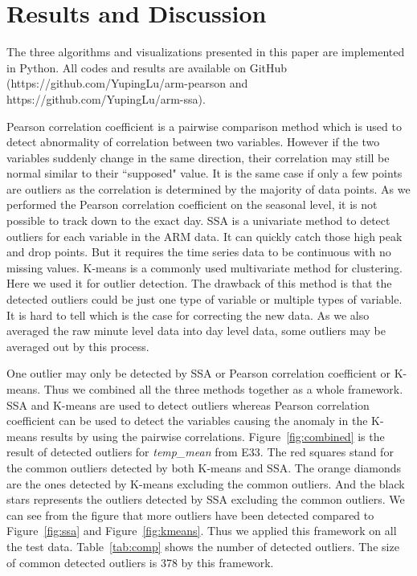 \section{Results and Discussion}
The three algorithms and visualizations presented in this paper are 
implemented in Python. All codes and results are available on GitHub 
(https://github.com/YupingLu/arm-pearson and https://github.com/YupingLu/arm-ssa). 

Pearson correlation coefficient is a pairwise comparison method which 
is used to detect abnormality of correlation between two variables. 
However if the two variables suddenly change in the same direction, 
their correlation may still be normal similar to their ``supposed" 
value. It is the same case if only a few points are outliers as the
correlation is determined by the majority of data points. 
As we performed the Pearson correlation 
coefficient on the seasonal level, it is not possible to track down 
to the exact day. SSA is a univariate method to detect outliers for 
each variable in the ARM data. It can quickly catch those high peak 
and drop points. But it requires the time series data to be continuous 
with no missing values. K-means is a commonly used multivariate method 
for clustering. Here we used it for outlier detection. The drawback of this method is 
that the detected outliers could be just one type of variable or 
multiple types of variable. It is hard to tell which is the case for 
correcting the new data. As we also averaged the raw 
minute level data into day level data, some outliers may be averaged 
out by this process.

One outlier may only be detected by SSA or Pearson correlation coefficient 
or K-means. Thus we combined all the three methods together as a 
whole framework. SSA and K-means are used to detect outliers whereas Pearson 
correlation coefficient can be used to detect the variables causing the anomaly 
in the K-means results by using the pairwise correlations. Figure~\ref{fig:combined} is the result of 
detected outliers for \textit{temp\_mean} from E33. The red squares 
stand for the common outliers detected by both K-means and SSA. The 
orange diamonds are the ones detected by K-means excluding the common 
outliers. And the black stars represents the outliers detected by SSA 
excluding the common outliers. We can see from the figure that more 
outliers have been detected compared to Figure~\ref{fig:ssa} and Figure~\ref{fig:kmeans}. 
Thus we applied this framework on all the test data. Table~\ref{tab:comp} 
shows the number of detected outliers. The size of common detected 
outliers is 378 by this framework.

